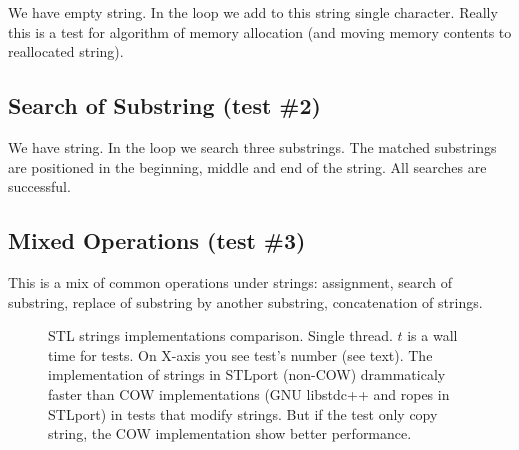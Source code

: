 \documentclass[a4paper]{article}
\providecommand{\STLport}{{\fontfamily{cmss}\selectfont STLport}}
\providecommand{\libstd}{{\fontfamily{cmtt}\selectfont GNU \mbox{libstdc++}}}
\begin{document}
We have empty string. In the loop we add to this string single
character.
Really this is a test for algorithm
of memory allocation (and moving memory contents to reallocated string).



\subsection{Search of Substring\label{search-string} (test \#2)}

We have string. In the loop we search three substrings.
The matched substrings are positioned in
the beginning, middle and end of the string. All searches are
successful.



\subsection{Mixed Operations\label{mixed-string} (test \#3)}

This is a mix of common operations under strings: assignment,
search of substring, replace of substring by another substring,
concatenation of strings.



\begin{figure}
  \begin{center}
    
  \end{center}
  \caption{STL strings implementations comparison. Single thread. $t$ is a wall time
           for tests. On X-axis you see test's number (see text).
           The implementation of strings in \STLport{} (non-COW)
           drammaticaly faster than COW implementations (\libstd{} and
           ropes in \STLport{}) in tests that modify strings.
           But if the test only copy string, the COW implementation show better
           performance.
           \label{STLport-gpp-strings}}
\end{figure}

%    
\end{document}
